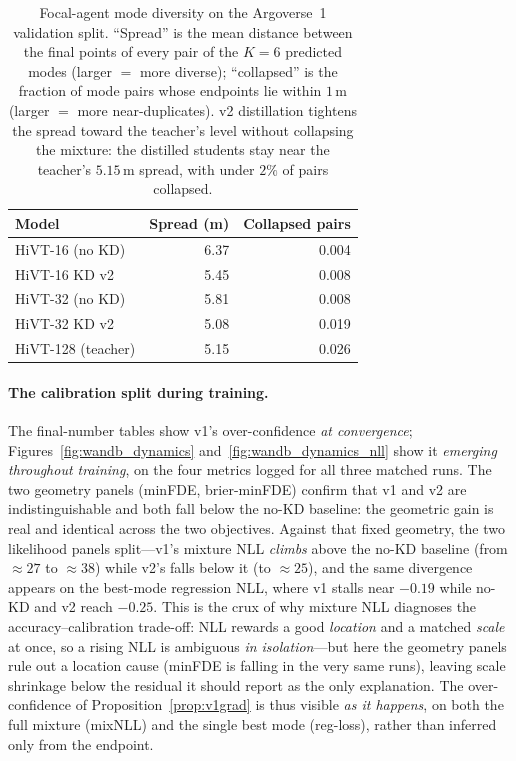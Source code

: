 \begin{table}[htbp]
  \centering
  \caption{Focal-agent mode diversity on the Argoverse~1 validation split.
    ``Spread'' is the mean distance between the final points of every pair of the
    $K{=}6$ predicted modes (larger $=$ more diverse); ``collapsed'' is the
    fraction of mode pairs whose endpoints lie within $1$\,m (larger $=$ more
    near-duplicates). v2 distillation tightens the spread toward the teacher's
    level without collapsing the mixture: the distilled students stay near the
    teacher's $5.15$\,m spread, with under $2\%$ of pairs collapsed.}
  \label{tab:diversity}
  \begin{tabular}{lrr}
    \toprule
    Model & Spread (m) & Collapsed pairs \\
    \midrule
    HiVT-16 (no KD)        & 6.37 & 0.004 \\
    HiVT-16 KD v2          & 5.45 & 0.008 \\
    HiVT-32 (no KD)        & 5.81 & 0.008 \\
    HiVT-32 KD v2          & 5.08 & 0.019 \\
    HiVT-128 (teacher)     & 5.15 & 0.026 \\
    \bottomrule
  \end{tabular}
\end{table}


\paragraph{The calibration split during training.}
The final-number tables show v1's over-confidence \emph{at convergence};
Figures~\ref{fig:wandb_dynamics} and~\ref{fig:wandb_dynamics_nll} show it
\emph{emerging throughout training}, on the four metrics logged for all three
matched runs. The two geometry panels
(minFDE, brier-minFDE) confirm that v1 and v2 are indistinguishable and both fall
below the no-KD baseline: the geometric gain is real and identical across the two
objectives. Against that fixed geometry, the two likelihood panels split---v1's
mixture NLL \emph{climbs} above the no-KD baseline (from ${\approx}27$ to
${\approx}38$) while v2's falls below it (to ${\approx}25$), and the same divergence
appears on the best-mode regression NLL, where v1 stalls near $-0.19$ while no-KD
and v2 reach $-0.25$. This is the crux of why mixture NLL diagnoses the
accuracy--calibration trade-off: NLL rewards a good \emph{location} and a matched
\emph{scale} at once, so a rising NLL is ambiguous \emph{in isolation}---but here
the geometry panels rule out a location cause (minFDE is falling in the very same
runs), leaving scale shrinkage below the residual it should report as the only
explanation. The over-confidence of Proposition~\ref{prop:v1grad} is thus visible
\emph{as it happens}, on both the full mixture (mixNLL) and the single best mode
(reg-loss), rather than inferred only from the endpoint.


